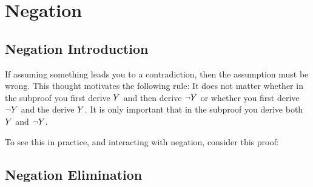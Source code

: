 \section{Negation}
\subsection{Negation Introduction}
If assuming something leads you to a contradiction, then the assumption must be wrong. 
This thought motivates the following rule:
It does not matter whether in the subproof you first derive $Y$ and then derive $\neg Y$ or whether you first derive $\neg Y$ and the derive $Y$. It is only important that in the subproof you derive both $Y$ and $\neg Y$.

To see this in practice, and interacting with negation, consider this proof:

	\begin{fitchproof}
		\open
		\close
	\end{fitchproof}

\subsection{Negation Elimination} 



